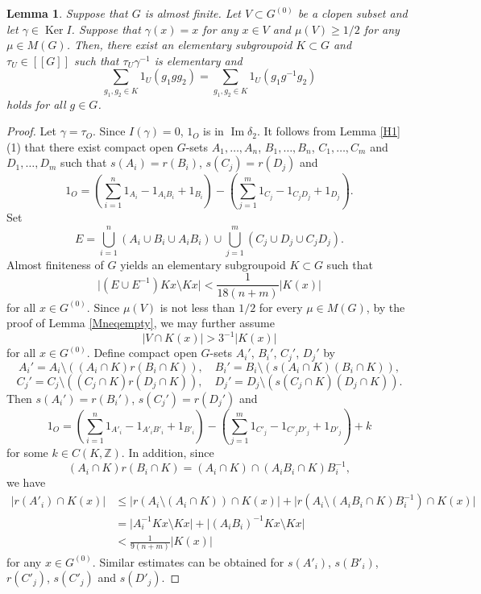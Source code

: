 \documentclass[11pt]{article}
\newtheorem{lem}[thm]{Lemma}
\theoremstyle{definition}
\renewcommand{\ker}{\operatorname{Ker}}
\newcommand{\Ima}{\operatorname{Im}}
\newcommand{\Z}{\mathbb{Z}}
\begin{document}
\begin{lem}\label{decomp2}
Suppose that $G$ is almost finite. 
Let $V\subset G^{(0)}$ be a clopen subset and let $\gamma\in\ker I$. 
Suppose that 
$\gamma(x)=x$ for any $x\in V$ and 
$\mu(V)\geq1/2$ for any $\mu\in M(G)$. 
Then, there exist an elementary subgroupoid $K\subset G$ and $\tau_U\in[[G]]$ 
such that $\tau_U\gamma^{-1}$ is elementary and 
\[
\sum_{g_1,g_2\in K}1_U(g_1gg_2)
=\sum_{g_1,g_2\in K}1_U(g_1g^{-1}g_2)
\]
holds for all $g\in G$. 
\end{lem}
\begin{proof}
Let $\gamma=\tau_O$. 
Since $I(\gamma)=0$, $1_O$ is in $\Ima\delta_2$. 
It follows from Lemma \ref{H1} (1) that 
there exist compact open $G$-sets 
$A_1,\dots,A_n$, $B_1,\dots,B_n$, $C_1,\dots,C_m$ and $D_1,\dots,D_m$ 
such that $s(A_i)=r(B_i)$, $s(C_j)=r(D_j)$ and 
\[
1_O=\left(\sum_{i=1}^n1_{A_i}-1_{A_iB_i}+1_{B_i}\right)
-\left(\sum_{j=1}^m1_{C_j}-1_{C_jD_j}+1_{D_j}\right). 
\]
Set 
\[
E=\bigcup_{i=1}^n(A_i\cup B_i\cup A_iB_i)
\cup\bigcup_{j=1}^m(C_j\cup D_j\cup C_jD_j). 
\]
Almost finiteness of $G$ yields 
an elementary subgroupoid $K\subset G$ such that 
\[
\lvert (E\cup E^{-1})Kx\setminus Kx\rvert
<\frac{1}{18(n{+}m)}\lvert K(x)\rvert
\]
for all $x\in G^{(0)}$. 
Since $\mu(V)$ is not less than $1/2$ for every $\mu\in M(G)$, 
by the proof of Lemma \ref{Mneqempty}, 
we may further assume 
\[
\lvert V\cap K(x)\rvert>3^{-1}\lvert K(x)\rvert
\]
for all $x\in G^{(0)}$. 
Define compact open $G$-sets $A_i'$, $B_i'$, $C_j'$, $D_j'$ by 
\[
A_i'=A_i\setminus((A_i\cap K)r(B_i\cap K)),\quad 
B_i'=B_i\setminus(s(A_i\cap K)(B_i\cap K)), 
\]
\[
C_j'=C_j\setminus((C_j\cap K)r(D_j\cap K)),\quad 
D_j'=D_j\setminus(s(C_j\cap K)(D_j\cap K)). 
\]
Then $s(A_i')=r(B_i')$, $s(C_j')=r(D_j')$ and 
\[
1_O=\left(\sum_{i=1}^n1_{A'_i}-1_{A'_iB'_i}+1_{B'_i}\right)
-\left(\sum_{j=1}^m1_{C'_j}-1_{C'_jD'_j}+1_{D'_j}\right)+k
\]
for some $k\in C(K,\Z)$. 
In addition, 
since 
\[
(A_i\cap K)r(B_i\cap K)=(A_i\cap K)\cap(A_iB_i\cap K)B_i^{-1}, 
\]
we have 
\begin{align*}
\lvert r(A'_i)\cap K(x)\rvert
&\leq\lvert r(A_i\setminus(A_i\cap K))\cap K(x)\rvert
+\lvert r(A_i\setminus(A_iB_i\cap K)B_i^{-1})\cap K(x)\rvert \\
&=\lvert A_i^{-1}Kx\setminus Kx\rvert
+\lvert (A_iB_i)^{-1}Kx\setminus Kx\rvert \\
&<\frac{1}{9(n{+}m)}\lvert K(x)\rvert
\end{align*}
for any $x\in G^{(0)}$. 
Similar estimates can be obtained 
for $s(A'_i)$, $s(B'_i)$, $r(C'_j)$, $s(C'_j)$ and $s(D'_j)$. 

\end{proof}
\end{document}
